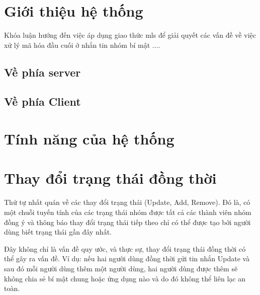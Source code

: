 \documentclass[../main-report.tex]{subfiles}
\begin{document}
\section{Giới thiệu hệ thống}
Khóa luận hướng đến việc áp dụng giao thức \acrshort{mls} để giải quyết các vấn đề về việc xử lý mã hóa đầu cuối ở nhắn tin nhóm bí mật ....

\subsection{Về phía server}

\subsection{Về phía Client}

\section{Tính năng của hệ thống}

\section{Thay đổi trạng thái đồng thời}
Thứ tự nhất quán về các thay đổi trạng thái (\gls{Update}, \gls{Add}, \gls{Remove}). Đó là, có một chuỗi tuyến tính của các trạng thái nhóm được tất cả các thành viên nhóm đồng ý và thông báo thay đổi trạng thái tiếp theo chỉ có thể được tạo bởi người dùng biết trạng thái gần đây nhất.

Đây không chỉ là vấn đề quy ước, và thực sự, thay đổi trạng thái đồng thời có thể gây ra vấn đề. Ví dụ: nếu hai người dùng đồng thời gửi tin nhắn \gls{Update} và sau đó mỗi người dùng thêm một người dùng, hai người dùng được thêm sẽ không chia sẻ bí mật chung hoặc ứng dụng nào và do đó không thể liên lạc an toàn.
\end{document}
